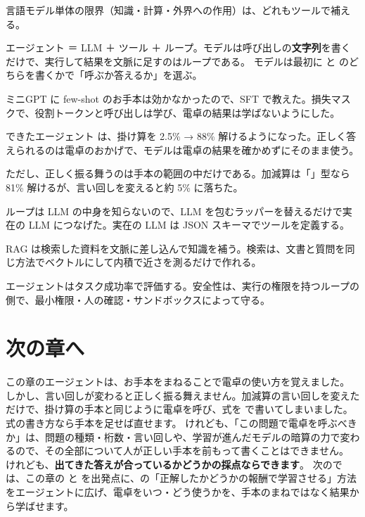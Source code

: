 \begin{summary}
\item 言語モデル単体の限界（知識・計算・外界への作用）は、どれもツールで補える。
\item エージェント ＝ LLM ＋ ツール ＋ ループ。モデルは呼び出しの\textbf{文字列}を書くだけで、実行して結果を文脈に足すのはループである。
モデルは最初に  と  のどちらを書くかで「呼ぶか答えるか」を選ぶ。
\item ミニGPT に few-shot のお手本は効かなかったので、SFT で教えた。損失マスクで、役割トークンと呼び出しは学び、電卓の結果は学ばないようにした。
\item できたエージェント  は、掛け算を 2.5\% → 88\% 解けるようになった。正しく答えられるのは電卓のおかげで、モデルは電卓の結果を確かめずにそのまま使う。
\item ただし、正しく振る舞うのは手本の範囲の中だけである。加減算は「」型なら 81\% 解けるが、言い回しを変えると約 5\% に落ちた。
\item ループは LLM の中身を知らないので、LLM を包むラッパーを替えるだけで実在の LLM につなげた。実在の LLM は JSON スキーマでツールを定義する。
\item RAG は検索した資料を文脈に差し込んで知識を補う。検索は、文書と質問を同じ方法でベクトルにして内積で近さを測るだけで作れる。
\item エージェントはタスク成功率で評価する。安全性は、実行の権限を持つループの側で、最小権限・人の確認・サンドボックスによって守る。
\end{summary}

\section*{次の章へ}

この章のエージェントは、お手本をまねることで電卓の使い方を覚えました。
しかし、言い回しが変わると正しく振る舞えません。加減算の言い回しを変えただけで、掛け算の手本と同じように電卓を呼び、式を \code{*} で書いてしまいました。
式の書き方なら手本を足せば直せます。
けれども、「この問題で電卓を呼ぶべきか」は、問題の種類・桁数・言い回しや、学習が進んだモデルの暗算の力で変わるので、その全部について人が正しい手本を前もって書くことはできません。
けれども、\textbf{出てきた答えが合っているかどうかの採点ならできます}。
次のでは、この章の  と  を出発点に、の「正解したかどうかの報酬で学習させる」方法をエージェントに広げ、電卓をいつ・どう使うかを、手本のまねではなく結果から学ばせます。

